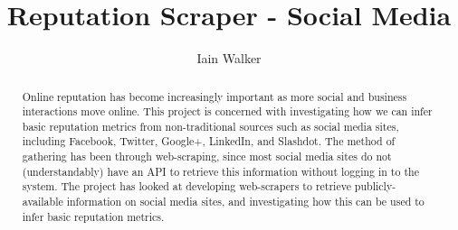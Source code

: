 \documentclass[11pt
              , a4paper
              , twoside
              , openright
              ]{report}
\title{Reputation Scraper - Social Media}
\author{Iain Walker}
\date{}
\begin{document}
\frontmatter



\begin{abstract}

Online reputation has become increasingly important as more social and business interactions move online. This project is concerned with investigating how we can infer basic reputation metrics from non-traditional sources such as social media sites, including Facebook, Twitter, Google+, LinkedIn, and Slashdot. The method of gathering has been through web-scraping, since most social media sites do not (understandably) have an API to retrieve this information without logging in to the system. The project has looked at developing web-scrapers to retrieve publicly-available information on social media sites, and investigating how this can be used to infer basic reputation metrics. 

\end{abstract}


\maketitle


\tableofcontents



\mainmatter


%
%



%
%
%
%
%
%



\backmatter



%
\nocite{*}


\end{document}
